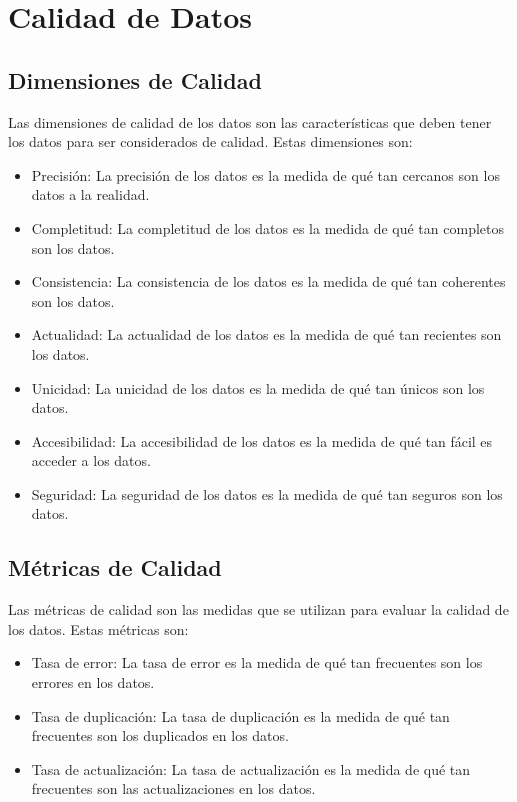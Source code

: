 \documentclass[12pt]{article}
\begin{document}
\section{Calidad de Datos}

\subsection{Dimensiones de Calidad}
Las dimensiones de calidad de los datos son las características que deben tener los datos para ser considerados de calidad. Estas dimensiones son:

\begin{itemize}
    \item Precisión: La precisión de los datos es la medida de qué tan cercanos son los datos a la realidad.
    \item Completitud: La completitud de los datos es la medida de qué tan completos son los datos.
    \item Consistencia: La consistencia de los datos es la medida de qué tan coherentes son los datos.
    \item Actualidad: La actualidad de los datos es la medida de qué tan recientes son los datos.
    \item Unicidad: La unicidad de los datos es la medida de qué tan únicos son los datos.
    \item Accesibilidad: La accesibilidad de los datos es la medida de qué tan fácil es acceder a los datos.
    \item Seguridad: La seguridad de los datos es la medida de qué tan seguros son los datos.
\end{itemize}

\subsection{Métricas de Calidad}
Las métricas de calidad son las medidas que se utilizan para evaluar la calidad de los datos. Estas métricas son:

\begin{itemize}
    \item Tasa de error: La tasa de error es la medida de qué tan frecuentes son los errores en los datos.
    \item Tasa de duplicación: La tasa de duplicación es la medida de qué tan frecuentes son los duplicados en los datos.
    \item Tasa de actualización: La tasa de actualización es la medida de qué tan frecuentes son las actualizaciones en los datos.
\end{itemize}
\end{document}
